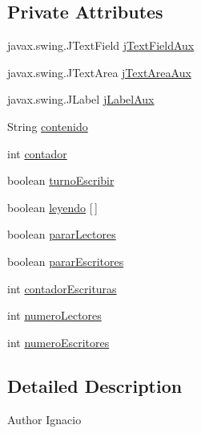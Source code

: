 \subsection*{Private Attributes}
\begin{DoxyCompactItemize}
\item 
javax.\+swing.\+J\+Text\+Field \mbox{\hyperlink{classpecl3ignacioriberalocks_1_1_libro_aa7207f75bf58afbf14b600038be4bc5f}{j\+Text\+Field\+Aux}}
\item 
javax.\+swing.\+J\+Text\+Area \mbox{\hyperlink{classpecl3ignacioriberalocks_1_1_libro_a16681c45336d0e06fcddcbff96b7bd5d}{j\+Text\+Area\+Aux}}
\item 
javax.\+swing.\+J\+Label \mbox{\hyperlink{classpecl3ignacioriberalocks_1_1_libro_a36ec328acc3a2636adeb3d93b67c5184}{j\+Label\+Aux}}
\item 
String \mbox{\hyperlink{classpecl3ignacioriberalocks_1_1_libro_a5da87c57f21f55953a8b839be533260e}{contenido}}
\item 
int \mbox{\hyperlink{classpecl3ignacioriberalocks_1_1_libro_a279dfb87514394851e8eefc5497f38ca}{contador}}
\item 
boolean \mbox{\hyperlink{classpecl3ignacioriberalocks_1_1_libro_a9f34d1b5656405e993083bd5f1bb1a27}{turno\+Escribir}}
\item 
boolean \mbox{\hyperlink{classpecl3ignacioriberalocks_1_1_libro_a07b101f066333c63dad3cd1ef98c1a5d}{leyendo}} \mbox{[}$\,$\mbox{]}
\item 
boolean \mbox{\hyperlink{classpecl3ignacioriberalocks_1_1_libro_a78afb2edbbd4a15475672b3a967c223a}{parar\+Lectores}}
\item 
boolean \mbox{\hyperlink{classpecl3ignacioriberalocks_1_1_libro_af0d9e9c98f0aa4cd5a5aa0c0be6a9fc3}{parar\+Escritores}}
\item 
int \mbox{\hyperlink{classpecl3ignacioriberalocks_1_1_libro_a5d06fe0f5003ffac5e6e1cc8713debe6}{contador\+Escrituras}}
\item 
int \mbox{\hyperlink{classpecl3ignacioriberalocks_1_1_libro_a7c53211c6562aff8e31edf3e76882bc7}{numero\+Lectores}}
\item 
int \mbox{\hyperlink{classpecl3ignacioriberalocks_1_1_libro_a3ce4bcaf93bab9853ac3a450ed709626}{numero\+Escritores}}
\end{DoxyCompactItemize}


\subsection{Detailed Description}
\begin{DoxyAuthor}{Author}
Ignacio 
\end{DoxyAuthor}


